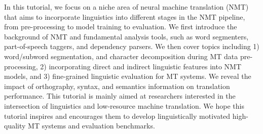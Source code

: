 In this tutorial, we focus on a niche area of neural machine translation (NMT) that aims to incorporate linguistics into different stages in the NMT pipeline, from pre-processing to model training to evaluation. We first introduce the background of NMT and fundamental analysis tools, such as word segmenters, part-of-speech taggers, and dependency parsers. We then cover topics including 1) word/subword segmentation, and character decomposition during MT data pre-processing, 2) incorporating direct and indirect linguistic features into NMT models, and 3) fine-grained linguistic evaluation for MT systems. We reveal the impact of orthography, syntax, and semantics information on translation performance. This tutorial is mainly aimed at researchers interested in the intersection of linguistics and low-resource machine translation. We hope this tutorial inspires and encourages them to develop linguistically motivated high-quality MT systems and evaluation benchmarks.
